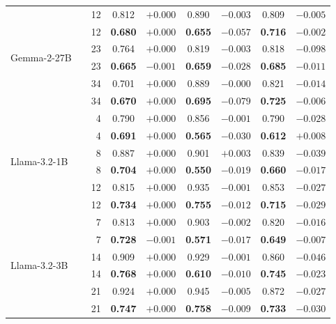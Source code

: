 \begin{table}[t]
\begin{tabular}{llr|cc|cc|cc}
\midrule
\multirow{6}{*}{Gemma-2-27B}
 & \AmbGCE{}          & 12 & 0.812 & $+0.000$ & 0.890 & $-0.003$ & 0.809 & $-0.005$ \\
 & \textbf{\TanGCE{}} & 12 & \textbf{0.680} & $+0.000$ & \textbf{0.655} & $-0.057$ & \textbf{0.716} & $-0.002$ \\
 & \AmbGCE{}          & 23 & 0.764 & $+0.000$ & 0.819 & $-0.003$ & 0.818 & $-0.098$ \\
 & \textbf{\TanGCE{}} & 23 & \textbf{0.665} & $-0.001$ & \textbf{0.659} & $-0.028$ & \textbf{0.685} & $-0.011$ \\
 & \AmbGCE{}          & 34 & 0.701 & $+0.000$ & 0.889 & $-0.000$ & 0.821 & $-0.014$ \\
 & \textbf{\TanGCE{}} & 34 & \textbf{0.670} & $+0.000$ & \textbf{0.695} & $-0.079$ & \textbf{0.725} & $-0.006$ \\
\midrule
\multirow{6}{*}{Llama-3.2-1B}
 & \AmbGCE{}          & 4  & 0.790 & $+0.000$ & 0.856 & $-0.001$ & 0.790 & $-0.028$ \\
 & \textbf{\TanGCE{}} & 4  & \textbf{0.691} & $+0.000$ & \textbf{0.565} & $-0.030$ & \textbf{0.612} & $+0.008$ \\
 & \AmbGCE{}          & 8  & 0.887 & $+0.000$ & 0.901 & $+0.003$ & 0.839 & $-0.039$ \\
 & \textbf{\TanGCE{}} & 8  & \textbf{0.704} & $+0.000$ & \textbf{0.550} & $-0.019$ & \textbf{0.660} & $-0.017$ \\
 & \AmbGCE{}          & 12 & 0.815 & $+0.000$ & 0.935 & $-0.001$ & 0.853 & $-0.027$ \\
 & \textbf{\TanGCE{}} & 12 & \textbf{0.734} & $+0.000$ & \textbf{0.755} & $-0.012$ & \textbf{0.715} & $-0.029$ \\
\midrule
\multirow{6}{*}{Llama-3.2-3B}
 & \AmbGCE{}          & 7  & 0.813 & $+0.000$ & 0.903 & $-0.002$ & 0.820 & $-0.016$ \\
 & \textbf{\TanGCE{}} & 7  & \textbf{0.728} & $-0.001$ & \textbf{0.571} & $-0.017$ & \textbf{0.649} & $-0.007$ \\
 & \AmbGCE{}          & 14 & 0.909 & $+0.000$ & 0.929 & $-0.001$ & 0.860 & $-0.046$ \\
 & \textbf{\TanGCE{}} & 14 & \textbf{0.768} & $+0.000$ & \textbf{0.610} & $-0.010$ & \textbf{0.745} & $-0.023$ \\
 & \AmbGCE{}          & 21 & 0.924 & $+0.000$ & 0.945 & $-0.005$ & 0.872 & $-0.027$ \\
 & \textbf{\TanGCE{}} & 21 & \textbf{0.747} & $+0.000$ & \textbf{0.758} & $-0.009$ & \textbf{0.733} & $-0.030$ \\

\end{tabular}
\end{table}
